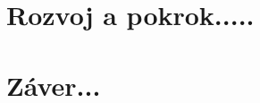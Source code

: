 \documentclass[10pt,twoside,slovak,a4paper]{article}
\begin{document}
\section{Rozvoj a pokrok.....}  \label{Rozvoj}
\cite{9730383}
\cite{9291553}

\section{Záver...}





\end{document}
